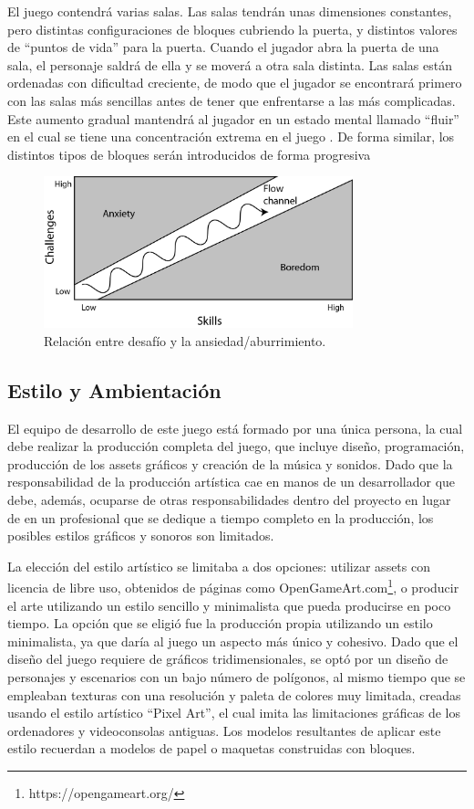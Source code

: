 El juego contendrá varias salas. Las salas tendrán unas dimensiones constantes, pero distintas configuraciones de bloques cubriendo la puerta, y distintos valores de ``puntos de vida'' para la puerta. Cuando el jugador abra la puerta de una sala, el personaje saldrá de ella y se moverá a otra sala distinta.  Las salas están ordenadas con dificultad creciente, de modo que el jugador se encontrará primero con las salas más sencillas antes de tener que enfrentarse a las más complicadas. Este aumento gradual mantendrá al jugador en un estado mental llamado ``fluir'' en el cual se tiene una concentración extrema en el juego \cite{flow}. De forma similar, los distintos tipos de bloques serán introducidos de forma progresiva

\begin{figure}[h]
	\includegraphics[width=0.8\textwidth]{images/intro/design/flow}
	\centering
	\caption{Relación entre desafío y la ansiedad/aburrimiento.}
\end{figure}

\subsection{Estilo y Ambientación}
El equipo de desarrollo de este juego está formado por una única persona, la cual debe realizar la producción completa del juego, que incluye diseño, programación, producción de los assets gráficos y creación de la música y sonidos. Dado que la responsabilidad de la producción artística cae en manos de un desarrollador que debe, además, ocuparse de otras responsabilidades dentro del proyecto en lugar de en un profesional que se dedique a tiempo completo en la producción, los posibles estilos gráficos y sonoros son limitados.

La elección del estilo artístico se limitaba a dos opciones: utilizar assets con licencia de libre uso, obtenidos de páginas como OpenGameArt.com\footnote{https://opengameart.org/}, o producir el arte utilizando un estilo sencillo y minimalista que pueda producirse en poco tiempo. La opción que se eligió fue la producción propia utilizando un estilo minimalista, ya que daría al juego un aspecto más único y cohesivo.
Dado que el diseño del juego requiere de gráficos tridimensionales, se optó por un diseño de personajes y escenarios con un bajo número de polígonos, al mismo tiempo que se empleaban texturas con una resolución y paleta de colores muy limitada, creadas usando el estilo artístico ``Pixel Art'', el cual imita las limitaciones gráficas de los ordenadores y videoconsolas antiguas. Los modelos resultantes de aplicar este estilo recuerdan a modelos de papel o maquetas construidas con bloques.

